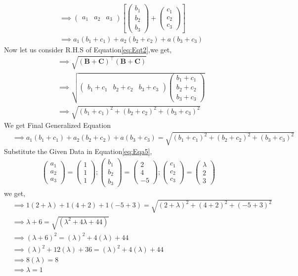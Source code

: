 \documentclass[10pt, a4paper]{article}
\newcommand{\myvec}[1]{\ensuremath{\begin{pmatrix}#1\end{pmatrix}}}
\let\vec\mathbf
\providecommand{\brak}[1]{\ensuremath{\left(#1\right)}}
\providecommand{\sbrak}[1]{\ensuremath{{}\left[#1\right]}}
\begin{document}
\begin{enumerate}
\begin{align}
   &\implies \myvec{a_1&a_2&a_3}\sbrak{\myvec{b_1\\b_2\\b_3}+\myvec{c_1\\c_2\\c_3}}\\
   &\implies a_1(b_1+c_1)+a_2(b_2+c_2)+a(b_3+c_3)
\end{align}
Now let us consider R.H.S of Equation\eqref{eq:Eqt2},we get,
\begin{align}
    &\implies \sqrt{\brak{\vec{B}+\vec{C}}^\top\brak{\vec{B}+\vec{C}}}\\
    &\implies \sqrt{\myvec{b_1+c_1&b_2+c_2&b_3+c_3}\myvec{b_1+c_1\\b_2+c_2\\b_3+c_3}}\\
    &\implies \sqrt{\brak{b_1+c_1}^2+\brak{b_2+c_2}^2+\brak{b_3+c_3}^2}
\end{align}
We get Final Generalized Equation
\begin{align}
     &\implies a_1(b_1+c_1)+a_2(b_2+c_2)+a(b_3+c_3)= \sqrt{\brak{b_1+c_1}^2+\brak{b_2+c_2}^2+\brak{b_3+c_3}^2} \label{eq:Eqa5}
\end{align}
Substitute the Given Data in Equation\eqref{eq:Eqa5},
\begin{align*}
\myvec{a_1\\a_2\\a_3}=\myvec{1\\1\\1};\myvec{b_1\\b_2\\b_3}=\myvec{2\\4\\-5};\myvec{c_1\\c_2\\c_3}=\myvec{\lambda\\2\\3}
\end{align*}
we get,
\begin{align}   
&\implies 1\brak{2+\lambda}+1\brak{4+2}+1\brak{-5+3}=\sqrt{\brak{2+\lambda}^2+\brak{4+2}^2+\brak{-5+3}^2}\\
& \implies \lambda +6 = \sqrt{\brak{\lambda ^2+4 \lambda +44}}\\
& \implies\brak{ \lambda +6}^2 = \brak{\lambda} ^2+4 \brak{\lambda} +44\\
& \implies \brak{\lambda}^2+12\brak{ \lambda }+36 = \brak{ \lambda }^2+4 \brak{\lambda} +44\\
& \implies  8\brak{\lambda} = 8\\
 &\implies \lambda = 1
\end{align}
\end{enumerate}
\end{document}

